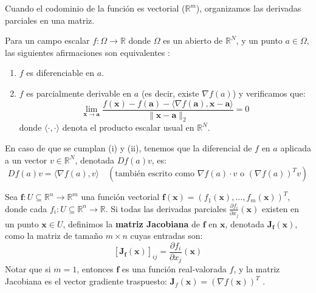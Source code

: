 Cuando el codominio de la función es vectorial ($\mathbb{R}^m$), organizamos las derivadas parciales en una matriz.

\begin{proposition}
\label{prop:diff_grad_scalar}
Para un campo escalar $f: \Omega \to \mathbb{R}$ donde $\Omega$ es un abierto de $\mathbb{R}^N$, y un punto $a \in \Omega$, las siguientes afirmaciones son equivalentes \citep{Apostol1974}:
    \begin{enumerate}
        \item $f$ es diferenciable en $a$.
        \item $f$ es parcialmente derivable en $a$ (es decir, existe $\nabla f(a)$) y verificamos que:
              \begin{equation} \label{eq:diff_limit_condition_scalar}
              \lim_{\mathbf{x} \to \mathbf{a}} \frac{f(\mathbf{x}) - f(\mathbf{a}) - \langle \nabla f(\mathbf{a}), \mathbf{x}-\mathbf{a} \rangle}{\lVert \mathbf{x}-\mathbf{a} \rVert_2} = 0
              \end{equation}
              donde $\langle \cdot, \cdot \rangle$ denota el producto escalar usual en $\mathbb{R}^N$.
    \end{enumerate}
En caso de que se cumplan (i) y (ii), tenemos que la diferencial de $f$ en $a$ aplicada a un vector $v \in \mathbb{R}^N$, denotada $Df(a)v$, es:
    \begin{equation} \label{eq:diff_as_grad_dot_prod_scalar}
    Df(a)v = \langle \nabla f(a), v \rangle \quad (\text{también escrito como } \nabla f(a) \cdot v \text{ o } (\nabla f(a))^T v)
    \end{equation}
\end{proposition}

\begin{definition}
\label{def:jacobian_general}
Sea $\mathbf{f}: U \subseteq \mathbb{R}^n \to \mathbb{R}^m$ una función vectorial $\mathbf{f}(\mathbf{x}) = (f_1(\mathbf{x}), \dots, f_m(\mathbf{x}))^T$, donde cada $f_i: U \subseteq \mathbb{R}^n \to \mathbb{R}$. Si todas las derivadas parciales $\frac{\partial f_i}{\partial x_j}(\mathbf{x})$ existen en un punto $\mathbf{x} \in U$, definimos la \textbf{matriz Jacobiana} de $\mathbf{f}$ en $\mathbf{x}$, denotada $\mathbf{J}_{\mathbf{f}}(\mathbf{x})$, como la matriz de tamaño $m \times n$ cuyas entradas son:
\[ [\mathbf{J}_{\mathbf{f}}(\mathbf{x})]_{ij} = \frac{\partial f_i}{\partial x_j}(\mathbf{x}) \]
Notar que si $m=1$, entonces $\mathbf{f}$ es una función real-valorada $f$, y la matriz Jacobiana es el vector gradiente traspuesto: $\mathbf{J}_{f}(\mathbf{x}) = (\nabla f(\mathbf{x}))^T$ \citep{Apostol1974, Bishop2006}.
\end{definition}

